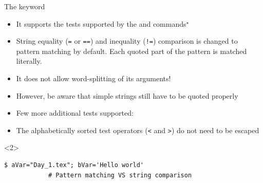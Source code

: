 \begin{frame}[fragile]{The \bash{[[} keyword}
    \vspace{-1mm}
    \begin{itemize}[<only@1>]
        \item It supports the tests supported by the  and \bash{[} commands$^{\star}$
        \item String equality (\texttt{=} or \texttt{==}) and inequality (\texttt{!=}) comparison is changed to \alert{pattern matching} by default.
              Each quoted part of the pattern is matched literally.
        \item \alert{It does not allow word-splitting} of its arguments!
        \item However, be aware that simple strings still have to be quoted properly
        \item Few more additional tests supported:
        \item The alphabetically sorted test operators (\texttt{<} and \texttt{>}) do not need to be escaped
    \end{itemize}
    \begin{onlyenv}<2>
        \begin{lstlisting}[style=MyBash, aboveskip=-1mm, style=oddnumbers, style=smaller, xleftmargin=1mm, xrightmargin=1mm]
            $ aVar="Day_1.tex"; bVar='Hello world'
            # Pattern matching VS string comparison

\end{lstlisting}
\end{onlyenv}
\end{frame}
